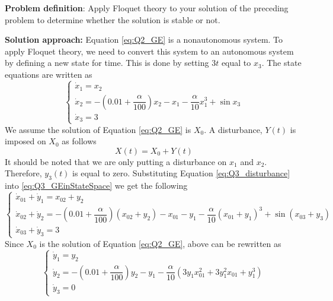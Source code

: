\textbf{Problem definition}:
Apply Floquet theory to your solution of the preceding problem to determine whether the solution is stable or not.

\noindent\hrulefill

\textbf{Solution approach:}
Equation \eqref{eq:Q2_GE} is a nonautonomous system. To apply Floquet theory, we need to convert this system to an autonomous system by defining a new state for time. This is done by setting $3t$ equal to $x_3$. The state equations are written as
%
\begin{equation}\label{eq:Q3_GEinStateSpace}
\begin{cases}
	\dot{x}_1 = x_2 \\
	\dot{x}_2 = - \left( 0.01 + \dfrac{\alpha}{100} \right) x_2
						-x_1 - \dfrac{\alpha}{10} x_1^3 + \sin x_3 \\
	\dot{x}_3 = 3
\end{cases}
\end{equation}
% 
We assume the solution of Equation \eqref{eq:Q2_GE} is $X_0$. A disturbance, $Y(t)$ is imposed on $X_0$ as follows
%
\begin{equation}\label{eq:Q3_disturbance}
	X(t) = X_0 + Y(t)
\end{equation}
%
It should be noted that we are only putting a disturbance on $x_1$ and $x_2$. Therefore, $y_3(t)$ is equal to zero. Substituting Equation \eqref{eq:Q3_disturbance} into \eqref{eq:Q3_GEinStateSpace} we get the following
%
\begin{equation*}
\begin{cases}
	\dot{x}_{01} + \dot{y}_1 = x_{02} + y_{2} \\
	\dot{x}_{02} + \dot{y}_2 = - \left( 0.01 + \dfrac{\alpha}{100} \right) (x_{02} + y_2)
						                          -x_{01} - y_1 
						                          -\dfrac{\alpha}{10} (x_{01} + y_1)^3 + 
						                          \sin \left( x_{03} + y_3 \right) \\
	\dot{x}_{03} + \dot{y}_3 = 3
\end{cases}
\end{equation*}
%
Since $X_0$ is the solution of Equation \eqref{eq:Q2_GE}, above can be rewritten as
%
\begin{equation}\label{eq:Q3_disturbedStateSpace}
\begin{cases}
	\dot{y}_1 = y_{2} \\
	\dot{y}_2 = - \left( 0.01 + \dfrac{\alpha}{100} \right) y_2
						- y_1 
						-\dfrac{\alpha}{10} \left(3 y_1 x_{01}^2 + 3 y_1^2 x_{01} + y_1^3 \right) \\
	\dot{y}_3 = 0
\end{cases}
\end{equation}
